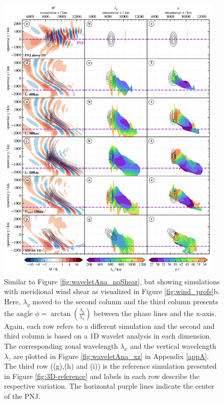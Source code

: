 \begin{figure}[tbp]
    \centering
    \includegraphics[width=0.96\textwidth]{figures_3D/waveletAna_angle.png}
    \caption{Similar to Figure \ref{fig:waveletAna_noShear}, but showing simulations with meridional wind shear as visualized in Figure \ref{fig:wind_profs}b. Here, $\lambda_y$ moved to the second column and the third column presents the angle $\phi=\arctan(\frac{\lambda_y}{\lambda_x})$ between the phase lines and the x-axis. Again, each row refers to a different simulation and the second and third column is based on a 1D wavelet analysis in each dimension. The corresponding zonal wavelength $\lambda_x$ and the vertical wavelength $\lambda_z$ are plotted in Figure \ref{fig:waveletAna_xz} in Appendix \ref{appA}. The third row ((g),(h) and (i)) is the reference simulation presented in Figure \ref{fig:3D-reference} and labels in each row describe the respective variation. The horizontal purple lines indicate the center of the PNJ.}
    \label{fig:waveletAna}
\end{figure}
